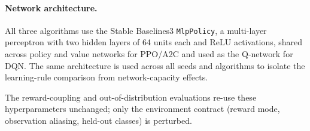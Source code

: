 \paragraph{Network architecture.} All three algorithms use the Stable Baselines3 \texttt{MlpPolicy}, a multi-layer perceptron with two hidden layers of 64 units each and ReLU activations, shared across policy and value networks for PPO/A2C and used as the Q-network for DQN. The same architecture is used across all seeds and algorithms to isolate the learning-rule comparison from network-capacity effects.

The reward-coupling and out-of-distribution evaluations re-use these hyperparameters unchanged; only the environment contract (reward mode, observation aliasing, held-out classes) is perturbed.
